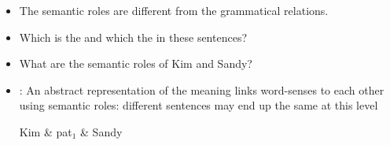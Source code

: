 \documentclass[a4paper,landscape,headrule,footrule,xetex]{foils}
\begin{document}
\begin{exe}
  \ex{}
  \ex{}
\end{exe}
\begin{itemize}
\item The semantic roles are different from the grammatical relations.
\item Which is the  and which the  in these sentences?
\item What are the semantic roles of Kim and Sandy?
\item {}: An abstract representation of the meaning links word-senses to
  each other using semantic roles: different sentences may end up the same at this level
\\[2ex] \begin{dependency}
\begin{deptext}[column sep=1em]
Kim \& pat$_1$ \& Sandy \\ %
\end{deptext}
\end{dependency}

\end{itemize}
\end{document}
